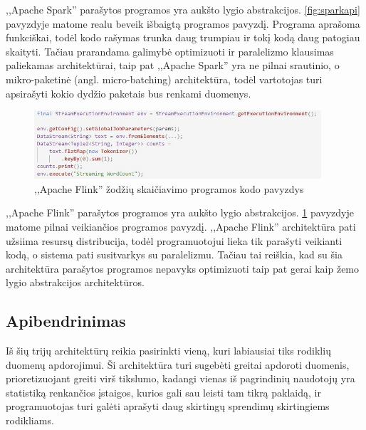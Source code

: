 \documentclass{VUMIFPSkursinis}
\begin{document}
,,Apache Spark'' parašytos programos yra aukšto lygio abstrakcijos. \ref{fig:sparkapi} pavyzdyje matome realu beveik išbaigtą programos pavyzdį. 
Programa aprašoma funkciškai, todėl kodo rašymas trunka daug trumpiau ir tokį kodą daug patogiau skaityti. Tačiau prarandama galimybė optimizuoti
ir paralelizmo klausimas paliekamas architektūrai, taip pat ,,Apache Spark'' yra ne pilnai srautinio, o mikro-paketinė (angl. micro-batching) 
architektūra, todėl vartotojas turi apsirašyti kokio dydžio paketais bus renkami duomenys\cite{shoro2015big}.

\begin{figure}[!htbp]
    \centering
    \includegraphics[width=0.95\textwidth]{img/FlinkAPI.jpg}
    \caption{,,Apache Flink'' žodžių skaičiavimo programos kodo pavyzdys}
    \label{fig:flinkapi}
\end{figure} \par

,,Apache Flink'' parašytos programos yra aukšto lygio abstrakcijos. \ref{fig:flinkapi} pavyzdyje matome pilnai veikiančios programos pavyzdį. ,,Apache Flink'' 
architektūra pati užsiima resursų distribucija, todėl programuotojui lieka tik parašyti veikianti kodą, o sistema pati susitvarkys su paralelizmu. Tačiau 
tai reiškia, kad su šia architektūra parašytos programos nepavyks optimizuoti taip pat gerai kaip žemo lygio abstrakcijos architektūros.

\subsection{Apibendrinimas}
Iš šių trijų architektūrų reikia pasirinkti vieną, kuri labiausiai tiks rodiklių duomenų apdorojimui. Ši architektūra turi sugebėti greitai apdoroti duomenis,
prioretizuojant greiti virš tikslumo, kadangi vienas iš pagrindinių naudotojų yra statistiką renkančios įstaigos, kurios gali sau leisti tam tikrą paklaidą,
ir programuotojas turi galėti aprašyti daug skirtingų sprendimų skirtingiems rodikliams.\par
\end{document}
